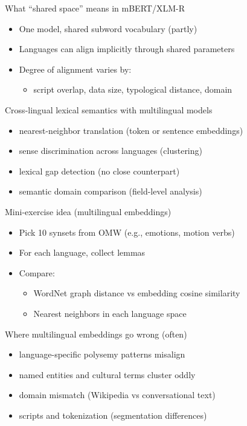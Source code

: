\documentclass{beamer}
\begin{document}
\begin{frame}{What ``shared space'' means in mBERT/XLM-R}
\begin{itemize}
  \item One model, shared subword vocabulary (partly)
  \item Languages can align implicitly through shared parameters
  \item Degree of alignment varies by:
  \begin{itemize}
    \item script overlap, data size, typological distance, domain
  \end{itemize}
\end{itemize}
\end{frame}

\begin{frame}{Cross-lingual lexical semantics with multilingual models}
\begin{itemize}
  \item nearest-neighbor translation (token or sentence embeddings)
  \item sense discrimination across languages (clustering)
  \item lexical gap detection (no close counterpart)
  \item semantic domain comparison (field-level analysis)
\end{itemize}
\end{frame}

\begin{frame}{Mini-exercise idea (multilingual embeddings)}
\begin{itemize}
  \item Pick 10 synsets from OMW (e.g., emotions, motion verbs)
  \item For each language, collect lemmas
  \item Compare:
  \begin{itemize}
    \item WordNet graph distance vs embedding cosine similarity
    \item Nearest neighbors in each language space
  \end{itemize}
\end{itemize}
\end{frame}

\begin{frame}{Where multilingual embeddings go wrong (often)}
\begin{itemize}
  \item language-specific polysemy patterns misalign
  \item named entities and cultural terms cluster oddly
  \item domain mismatch (Wikipedia vs conversational text)
  \item scripts and tokenization (segmentation differences)
\end{itemize}
\end{frame}
\end{document}
